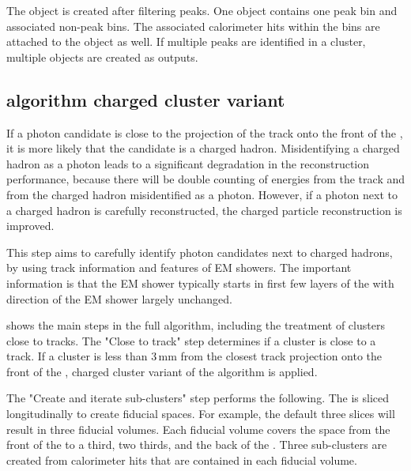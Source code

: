 
The \ShowerPeak  object is created after  filtering peaks. One \ShowerPeak object contains one peak bin and associated non-peak bins. The associated calorimeter hits within the bins are attached to the \ShowerPeak object as well. If multiple peaks are identified in a cluster, multiple \ShowerPeak objects are created as outputs.



\subsection{\peakFinding algorithm charged cluster variant}
\label{sec:photon2Dtrack}
If  a photon candidate is close to the projection of the track onto the front of the \ECAL, it is more likely that the candidate is a charged hadron. Misidentifying a charged hadron as a photon leads to a significant degradation in the reconstruction performance, because there will be double counting of energies from the track and from the charged hadron misidentified as a photon. However, if a photon next to a charged hadron is carefully reconstructed, the charged particle reconstruction is improved.

This step aims to carefully identify photon candidates next to charged hadrons, by using track information and features of EM showers. The important information is that the EM shower typically starts in first few layers of the \ECAL with direction of the EM shower largely unchanged.


 shows the main steps in the full \peakFinding algorithm, including the treatment of clusters close to tracks. The "Close to track" step determines if a cluster is close to a track. If a cluster is less than 3\,mm from the closest track projection onto the front of the \ECAL, charged cluster variant of the \peakFinding algorithm is applied.



The "Create and iterate sub-clusters" step performs the following. The \ECAL is sliced longitudinally to create fiducial spaces. For example, the default three slices will result in three \ECAL fiducial volumes. Each fiducial volume covers the  space from the front of the \ECAL to a third, two thirds, and the back of the \ECAL. Three sub-clusters are created from calorimeter hits that are contained in each fiducial volume.

